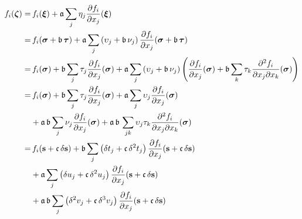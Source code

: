 \begin{align*}
f_{i} \! \left( \mbox{\boldmath{$\zeta$}} \right)
%
=& \,
f_{i} \! \left( \mbox{\boldmath{$\xi$}}\right) 
+ \mathfrak{a} \sum_{j} \eta_{j} \frac{ \partial f_{i} }{ \partial x_{j} } \! \left( \mbox{\boldmath{$\xi$}} \right) 
\\
%
=& \,
f_{i} \! \left( \mbox{\boldmath{$\sigma$}} + \mathfrak{b} \, \mbox{\boldmath{$\tau$}} \right) 
+ \mathfrak{a} \sum_{j} \left( \upsilon_{j} + \mathfrak{b} \, \nu_{j} \right)
\frac{ \partial f_{i} }{ \partial x_{j} } 
\! \left( \mbox{\boldmath{$\sigma$}} + \mathfrak{b} \, \mbox{\boldmath{$\tau$}} \right) 
\\
%
=& \,
f_{i} \! \left( \mbox{\boldmath{$\sigma$}} \right) + \mathfrak{b} 
\sum_{j} \tau_{j} \frac{ \partial f_{i} }{ \partial x_{j} } 
\! \left( \mbox{\boldmath{$\sigma$}} \right)
+ \mathfrak{a} \sum_{j} \left( \upsilon_{j} + \mathfrak{b} \, \nu_{j} \right)
\left( \frac{ \partial f_{i} }{ \partial x_{j} } \! \left( \mbox{\boldmath{$\sigma$}} \right)
+ \mathfrak{b} \sum_{k} \tau_{k}
\frac{ \partial^{2} f_{i} }{ \partial x_{j} \partial x_{k} } \! \left( \mbox{\boldmath{$\sigma$}} \right) \right) 
\\
%
=& \,
f_{i} \! \left( \mbox{\boldmath{$\sigma$}} \right) + \mathfrak{b} 
\sum_{j} \tau_{j} \frac{ \partial f_{i} }{ \partial x_{j} } 
\! \left( \mbox{\boldmath{$\sigma$}} \right)
+ \mathfrak{a} \sum_{j}
\upsilon_{j} \frac{ \partial f_{i} }{ \partial x_{j} } \! \left( \mbox{\boldmath{$\sigma$}} \right)
\\
& + \mathfrak{a} \, \mathfrak{b} \sum_{j}
 \nu_{j} \frac{ \partial f_{i} }{ \partial x_{j} } \! \left( \mbox{\boldmath{$\sigma$}} \right)
+ \mathfrak{a} \, \mathfrak{b} \, \sum_{jk} \upsilon_{j} \tau_{k}
\frac{ \partial^{2} f_{i} }{ \partial x_{j} \partial x_{k} } \! \left( \mbox{\boldmath{$\sigma$}} \right)
\\
%
=& \,
f_{i} \! \left( \mathbf{s} + \mathfrak{c} \, \delta \mathbf{s} \right) + \mathfrak{b} 
\sum_{j} \left( \delta t_{j} + \mathfrak{c} \, \delta^{2} t_{j} \right) 
\frac{ \partial f_{i} }{ \partial x_{j} } \! \left( \mathbf{s} + \mathfrak{c} \, \delta \mathbf{s}\right)
\\
&+ 
\mathfrak{a} \sum_{j}
\left( \delta u_{j} + \mathfrak{c} \, \delta^{2} u_{j} \right) 
\frac{ \partial f_{i} }{ \partial x_{j} } \! \left( \mathbf{s} + \mathfrak{c} \, \delta \mathbf{s}\right)
\\
& + \mathfrak{a} \, \mathfrak{b} \sum_{j}
\left( \delta^{2} v_{j} + \mathfrak{c} \, \delta^{3} v_{j} \right) 
\frac{ \partial f_{i} }{ \partial x_{j} } \! \left( \mathbf{s} + \mathfrak{c} \, \delta \mathbf{s} \right)

\end{align*}
